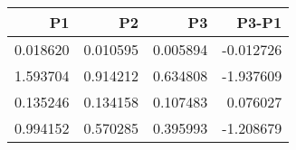 \begin{tabular}{rrrr}
\toprule
P1 & P2 & P3 & P3-P1 \\
\midrule
0.018620 & 0.010595 & 0.005894 & -0.012726 \\
1.593704 & 0.914212 & 0.634808 & -1.937609 \\
0.135246 & 0.134158 & 0.107483 & 0.076027 \\
0.994152 & 0.570285 & 0.395993 & -1.208679 \\
\bottomrule
\end{tabular}
